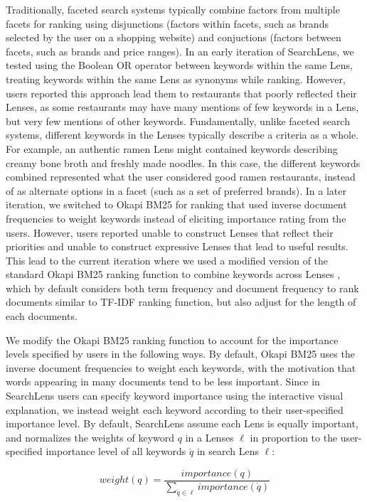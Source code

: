 Traditionally, faceted search systems typically combine factors from multiple facets for ranking using disjunctions (factors within facets, such as brands selected by the user on a shopping website) and conjuctions (factors between facets, such as brands and price ranges). In an early iteration of SearchLens, we tested using the Boolean OR operator between keywords within the same Lens, treating keywords within the same Lens as synonyms while ranking. However, users reported this approach lead them to restaurants that poorly reflected their Lenses, as some restaurants may have many mentions of few keywords in a Lens, but very few mentions of other keywords. Fundamentally, unlike faceted search systems, different keywords in the Lenses typically describe a criteria as a whole. For example, an authentic ramen Lens might contained keywords describing creamy bone broth and freshly made noodles. In this case, the different keywords combined represented what the user considered good ramen restaurants, instead of as alternate options in a facet (such as a set of preferred brands). In a later iteration, we switched to Okapi BM25 for ranking that used inverse document frequencies to weight keywords instead of eliciting importance rating from the users. However, users reported unable to construct Lenses that reflect their priorities and unable to construct expressive Lenses that lead to useful results. This lead to the current iteration where we used a modified version of the standard Okapi BM25 ranking function to combine keywords across Lenses \cite{robertson2009probabilistic}, which by default considers both term frequency and document frequency to rank documents similar to TF-IDF ranking function, but also adjust for the length of each documents.

We modify the Okapi BM25 ranking function to account for the importance levels specified by users in the following ways. By default, Okapi BM25 uses the inverse document frequencies to weight each keywords, with the motivation that words appearing in many documents tend to be less important. Since in SearchLens users can specify keyword importance using the interactive visual explanation, we instead weight each keyword according to their user-specified importance level. By default, SearchLens assume each Lens is equally important, and normalizes the weights of keyword $q$ in a Lenses $\ell$ in proportion to the user-specified importance level of all keywords $\acute{q}$ in search Lens $\ell$:

$$weight(q) = \frac{importance(q)}{
    \sum_{\acute{q} \in \ell}{importance(\acute{q})}
}$$

